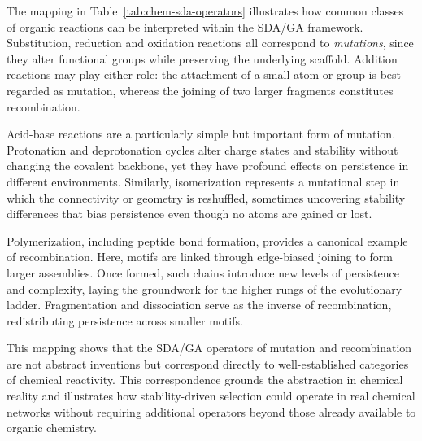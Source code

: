 \documentclass{artificial-life}
\begin{document}
The mapping in Table~\ref{tab:chem-sda-operators} illustrates how common classes of organic reactions can be interpreted within the SDA/GA framework. Substitution, reduction and oxidation reactions all correspond to \textit{mutations}, since they alter functional groups while preserving the underlying scaffold. Addition reactions may play either role: the attachment of a small atom or group is best regarded as mutation, whereas the joining of two larger fragments constitutes recombination.  

Acid-base reactions are a particularly simple but important form of mutation. Protonation and deprotonation cycles alter charge states and stability without changing the covalent backbone, yet they have profound effects on persistence in different environments. Similarly, isomerization represents a mutational step in which the connectivity or geometry is reshuffled, sometimes uncovering stability differences that bias persistence even though no atoms are gained or lost.  

Polymerization, including peptide bond formation, provides a canonical example of recombination. Here, motifs are linked through edge-biased joining to form larger assemblies. Once formed, such chains introduce new levels of persistence and complexity, laying the groundwork for the higher rungs of the evolutionary ladder. Fragmentation and dissociation serve as the inverse of recombination, redistributing persistence across smaller motifs.  

This mapping shows that the SDA/GA operators of mutation and recombination are not abstract inventions but correspond directly to well-established categories of chemical reactivity. This correspondence grounds the abstraction in chemical reality and illustrates how stability-driven selection could operate in real chemical networks without requiring additional operators beyond those already available to organic chemistry.
\end{document}
